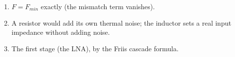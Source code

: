 \begin{enumerate}[leftmargin=1.6em,itemsep=2pt]
\item $F = F_{min}$ exactly (the mismatch term vanishes).
\item A resistor would add its own thermal noise; the inductor sets a real input impedance without adding noise.
\item The first stage (the LNA), by the Friis cascade formula.
\end{enumerate}
